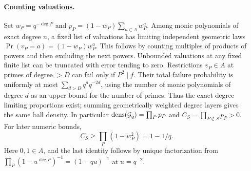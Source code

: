\documentclass[11pt]{article}
\begin{document}
\paragraph{Counting valuations.}
Set $w_P=q^{-\deg P}$ and $p_P=(1-w_P)\sum_{a\in A}w_P^a$. Among monic polynomials of exact degree $n$, a fixed list of valuations has limiting independent geometric laws $\Pr(v_P=a)=(1-w_P)w_P^a$. This follows by counting multiples of products of powers and then excluding the next powers. Unbounded valuations at any fixed finite list can be truncated with error tending to zero. Restrictions $v_P\in A$ at primes of degree $>D$ can fail only if $P^2\mid f$. Their total failure probability is uniformly at most $\sum_{d>D}q^d q^{-2d}$, using the number of monic polynomials of degree $d$ as an upper bound for the number of primes. Thus the exact-degree limiting proportions exist; summing geometrically weighted degree layers gives the same ball density. In particular $\operatorname{dens}(\mathcal G_q)=\prod_Pp_P$ and $C_S=\prod_{P\notin S}p_P>0$. For later numeric bounds,
\[
 C_S\ge\prod_P(1-w_P^2)=1-1/q.
\]
Here $0,1\in A$, and the last identity follows by unique factorization from $\prod_P(1-u^{\deg P})^{-1}=(1-qu)^{-1}$ at $u=q^{-2}$.
\end{document}
